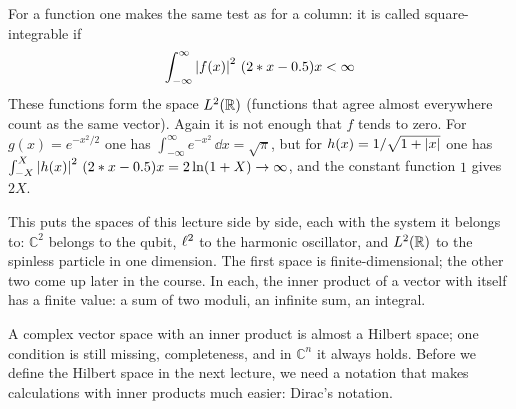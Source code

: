 
\begin{webonly}
For a function one makes the same test as for a column: it is called square-integrable if
\begin{equation*}
	\int_{-\infty}^{\infty} \left\lvert f(x) \right\rvert^2\, (2*x-0.5) x < \infty
\end{equation*}
These functions form the space $L^{2}(\mathbb{R})$ (functions that agree almost everywhere count as the same vector). Again it is not enough that $f$ tends to zero. For $g(x) = e^{-x^2/2}$ one has $\int_{-\infty}^{\infty} e^{-x^2}\, \dd x = \sqrt{\pi}$, but for $h(x) = 1/\sqrt{1+\left\lvert x \right\rvert}$ one has $\int_{-X}^{X} \left\lvert h(x) \right\rvert^2\, (2*x-0.5) x = 2\ln(1+X) \to \infty$, and the constant function $1$ gives $2X$.
\end{webonly}


\begin{webonly}
This puts the spaces of this lecture side by side, each with the system it belongs to: $\mathbb{C}^2$ belongs to the qubit, $\ell^{2}$ to the harmonic oscillator, and $L^{2}(\mathbb{R})$ to the spinless particle in one dimension. The first space is finite-dimensional; the other two come up later in the course. In each, the inner product of a vector with itself has a finite value: a sum of two moduli, an infinite sum, an integral.
\end{webonly}


A complex vector space with an inner product is almost a Hilbert space; one condition is still missing, completeness, and in $\mathbb{C}^n$ it always holds. Before we define the Hilbert space in the next lecture, we need a notation that makes calculations with inner products much easier: Dirac's notation.
